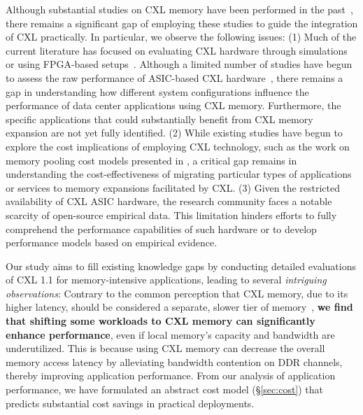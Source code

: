 Although substantial studies on CXL memory have been performed in the past~\cite{cxl_azure, cxlcentric, pond, tpp, cxltradeoff,demystify,directcxl, cxl-ssd}, there remains a significant gap of employing these studies to guide the integration of CXL practically.
In particular, we observe the following issues:
(1) Much of the current literature has focused on evaluating CXL hardware through simulations~\cite{pond, cxlcentric} or using FPGA-based setups~\cite{demystify, directcxl}. Although a limited number of studies have begun to assess the raw performance of ASIC-based CXL hardware~\cite{demystify, smt}, there remains a gap in understanding how different system configurations influence the performance of data center applications using CXL memory. Furthermore, the specific applications that could substantially benefit from CXL memory expansion are not yet fully identified.
(2) While existing studies have begun to explore the cost implications of employing CXL technology, such as the work on memory pooling cost models presented in \cite{CXLPoolCost}, a critical gap remains in understanding the cost-effectiveness of migrating particular types of applications or services to memory expansions facilitated by CXL.
(3) Given the restricted availability of CXL ASIC hardware, the research community faces a notable scarcity of open-source empirical data. This limitation hinders efforts to fully comprehend the performance capabilities of such hardware or to develop performance models based on empirical evidence. 

Our study aims to fill existing knowledge gaps by conducting detailed evaluations of CXL 1.1 for memory-intensive applications, leading to several \textit{intriguing observations}:
Contrary to the common perception that CXL memory, due to its higher latency, should be considered a separate, slower tier of memory~\cite{pond,tpp}, \textbf{we find that shifting some workloads to CXL memory can significantly enhance performance}, even if local memory's capacity and bandwidth are underutilized. This is because using CXL memory can decrease the overall memory access latency by alleviating bandwidth contention on DDR channels, thereby improving application performance.
From our analysis of application performance, we have formulated an abstract cost model (\S\ref{sec:cost}) that predicts substantial cost savings in practical deployments.

